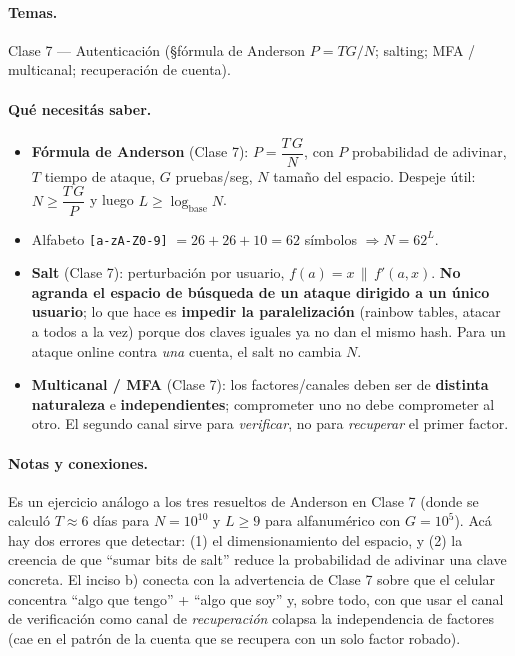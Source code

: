 \paragraph{Temas.}
Clase 7 — Autenticación (\S fórmula de Anderson $P=TG/N$; salting; MFA / multicanal; recuperación de cuenta).

\paragraph{Qué necesitás saber.}
\begin{itemize}
  \item \textbf{Fórmula de Anderson} (Clase 7): $P = \dfrac{T\,G}{N}$, con $P$ probabilidad de adivinar, $T$ tiempo de ataque, $G$ pruebas/seg, $N$ tamaño del espacio. Despeje útil: $N \ge \dfrac{T\,G}{P}$ y luego $L \ge \log_{\text{base}} N$.
  \item Alfabeto \texttt{[a-zA-Z0-9]} $= 26+26+10 = 62$ símbolos $\Rightarrow N = 62^{L}$.
  \item \textbf{Salt} (Clase 7): perturbación por usuario, $f(a)=x\,\|\,f'(a,x)$. \textbf{No agranda el espacio de búsqueda de un ataque dirigido a un único usuario}; lo que hace es \textbf{impedir la paralelización} (rainbow tables, atacar a todos a la vez) porque dos claves iguales ya no dan el mismo hash. Para un ataque online contra \emph{una} cuenta, el salt no cambia $N$.
  \item \textbf{Multicanal / MFA} (Clase 7): los factores/canales deben ser de \textbf{distinta naturaleza} e \textbf{independientes}; comprometer uno no debe comprometer al otro. El segundo canal sirve para \emph{verificar}, no para \emph{recuperar} el primer factor.
\end{itemize}

\paragraph{Notas y conexiones.}
Es un ejercicio análogo a los tres resueltos de Anderson en Clase 7 (donde se calculó $T\approx 6$ días para $N=10^{10}$ y $L\ge 9$ para alfanumérico con $G=10^5$). Acá hay dos errores que detectar: (1) el dimensionamiento del espacio, y (2) la creencia de que ``sumar bits de salt'' reduce la probabilidad de adivinar una clave concreta. El inciso b) conecta con la advertencia de Clase 7 sobre que el celular concentra ``algo que tengo'' + ``algo que soy'' y, sobre todo, con que usar el canal de verificación como canal de \emph{recuperación} colapsa la independencia de factores (cae en el patrón de la cuenta que se recupera con un solo factor robado).

